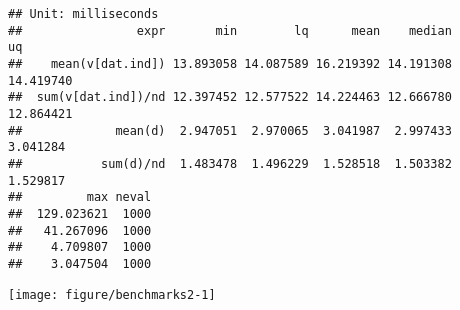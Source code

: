 \documentclass{article}\usepackage[]{graphicx}\usepackage[]{color}
\makeatletter
\def\maxwidth{ %
  \ifdim\Gin@nat@width>\linewidth
    \linewidth
  \else
    \Gin@nat@width
  \fi
}
\newenvironment{kframe}{%
 \def\at@end@of@kframe{}%
 \ifinner\ifhmode%
  \def\at@end@of@kframe{\end{minipage}}%
  \begin{minipage}{\columnwidth}%
 \fi\fi%
 \def\FrameCommand##1{\hskip\@totalleftmargin \hskip-\fboxsep
 \colorbox{shadecolor}{##1}\hskip-\fboxsep
     \hskip-\linewidth \hskip-\@totalleftmargin \hskip\columnwidth}%
 \MakeFramed {\advance\hsize-\width
   \@totalleftmargin\z@ \linewidth\hsize
   \@setminipage}}%
 {\par\unskip\endMakeFramed%
 \at@end@of@kframe}
\newenvironment{knitrout}{}{} %
\makeatother
\begin{document}
\begin{knitrout}
\color{fgcolor}\begin{kframe}
\begin{verbatim}
## Unit: milliseconds
##                expr       min        lq      mean    median        uq
##    mean(v[dat.ind]) 13.893058 14.087589 16.219392 14.191308 14.419740
##  sum(v[dat.ind])/nd 12.397452 12.577522 14.224463 12.666780 12.864421
##             mean(d)  2.947051  2.970065  3.041987  2.997433  3.041284
##           sum(d)/nd  1.483478  1.496229  1.528518  1.503382  1.529817
##         max neval
##  129.023621  1000
##   41.267096  1000
##    4.709807  1000
##    3.047504  1000
\end{verbatim}
\end{kframe}
\texttt{[image: figure/benchmarks2-1]} 

\end{knitrout}
\end{document}
